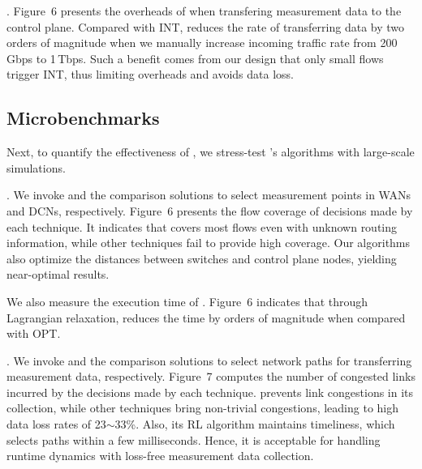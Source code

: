 . Figure~6 presents the overheads of \sysname when transfering measurement data to the control plane. Compared with INT, \sysname reduces the rate of transferring data by two orders of magnitude when we manually increase incoming traffic rate from 200\,Gbps to 1\,Tbps. Such a benefit comes from our design that only small flows trigger INT, thus limiting overheads and avoids data loss. 


\subsection{Microbenchmarks}

Next, to quantify the effectiveness of \sysname, we stress-test \sysname's algorithms with large-scale simulations. 

. We invoke \sysname and the comparison solutions to select measurement points in WANs and DCNs, respectively. Figure~6 presents the flow coverage of decisions made by each technique. It indicates that \sysname covers most flows even with unknown routing information, while other techniques fail to provide high coverage. Our algorithms also optimize the distances between switches and control plane nodes, yielding near-optimal results. 

We also measure the execution time of \sysname. Figure~6 indicates that through Lagrangian relaxation, \sysname reduces the time by orders of magnitude when compared with OPT. 


. We invoke \sysname and the comparison solutions to select network paths for transferring measurement data, respectively. Figure~7 computes the number of congested links incurred by the decisions made by each technique. \sysname prevents link congestions in its collection, while other techniques bring non-trivial congestions, leading to high data loss rates of 23$\sim$33\%. Also, its RL algorithm maintains timeliness, which selects paths within a few milliseconds. Hence, it is acceptable for handling runtime dynamics with loss-free measurement data collection. 

